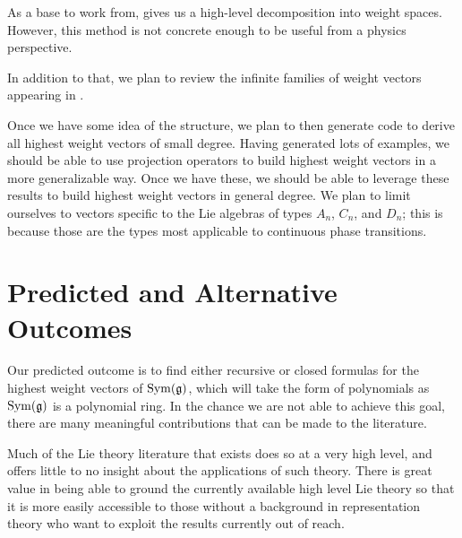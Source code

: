 \documentclass[11pt, reqno]{amsart}
\begin{document}
As a base to work from, \cite{Dau14} gives us a high-level decomposition into weight spaces. However, this method is not concrete enough to be useful from a physics perspective.

In addition to that, we plan to review the infinite families of weight vectors appearing in \cite{C20}. %

Once we have some idea of the structure, we plan to then generate code to derive all highest weight vectors of small degree. Having generated lots of examples, we should be able to use projection operators to build highest weight vectors in a more generalizable way. Once we have these, we should be able to leverage these results to build highest weight vectors in general degree. We plan to limit ourselves to vectors specific to the Lie algebras of types $A_{n}$, $C_{n}$, and $D_{n}$; this is because those are the types most applicable to continuous phase transitions.


\section{Predicted and Alternative Outcomes}

Our predicted outcome is to find either recursive or closed formulas for the highest weight vectors of $\operatorname{Sym}(\mathfrak{g})$, which will take the form of polynomials as $\operatorname{Sym}(\mathfrak{g})$ is a polynomial ring. In the chance we are not able to achieve this goal, there are many meaningful contributions that can be made to the literature.

Much of the Lie theory literature that exists does so at a very high level, and offers little to no insight about the applications of such theory. There is great value in being able to ground the currently available high level Lie theory so that it is more easily accessible to those without a background in representation theory who want to exploit the results currently out of reach.
\end{document}
